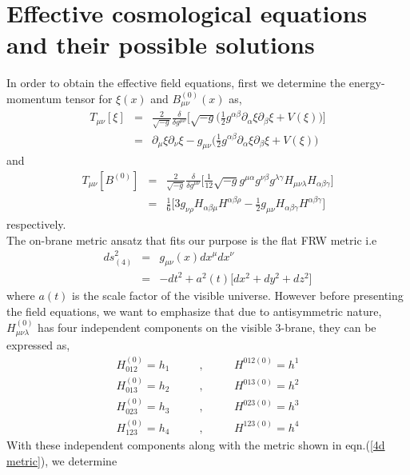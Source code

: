 \documentclass[a4paper]{article}
\begin{document}
\section{Effective cosmological equations and their possible solutions}
In order to obtain the effective field equations, 
first we determine the energy-momentum tensor for $\xi(x)$ and $B_{\mu\nu}^{(0)}(x)$ as,
\begin{eqnarray}
 T_{\mu\nu}[\xi]&=&\frac{2}{\sqrt{-g}}
 \frac{\delta}{\delta g^{\mu\nu}}\bigg[\sqrt{-g}\bigg(\frac{1}{2}g^{\alpha\beta}\partial_{\alpha}\xi\partial_{\beta}\xi + V(\xi)\bigg)\bigg]\nonumber\\
 &=&\partial_{\mu}\xi\partial_{\nu}\xi - g_{\mu\nu}\bigg(\frac{1}{2}g^{\alpha\beta}\partial_{\alpha}\xi\partial_{\beta}\xi + V(\xi)\bigg)
 \label{em tensor1}
\end{eqnarray}
and
\begin{eqnarray}
 T_{\mu\nu}[B^{(0)}]&=&\frac{2}{\sqrt{-g}}
 \frac{\delta}{\delta g^{\mu\nu}}\bigg[\frac{1}{12}\sqrt{-g}g^{\mu\alpha}g^{\nu\beta}g^{\lambda\gamma}H_{\mu\nu\lambda}H_{\alpha\beta\gamma}\bigg]\nonumber\\
 &=&\frac{1}{6}\bigg[3g_{\nu\rho}H_{\alpha\beta\mu}H^{\alpha\beta\rho} 
 - \frac{1}{2}g_{\mu\nu}H_{\alpha\beta\gamma}H^{\alpha\beta\gamma}\bigg]
 \label{em tensor2}
\end{eqnarray}
respectively.\\
The on-brane metric ansatz that fits our purpose is the flat FRW metric i.e
\begin{eqnarray}
 ds_{(4)}^2&=&g_{\mu\nu}(x) dx^{\mu}dx^{\nu}\nonumber\\
 &=&-dt^2 + a^2(t)\big[dx^2 + dy^2 + dz^2\big]
 \label{4d metric}
\end{eqnarray}
where $a(t)$ is the scale factor of the visible universe. 
However before presenting the field equations, we want to emphasize that due to antisymmetric nature, $H_{\mu\nu\lambda}^{(0)}$ has 
four independent components on the visible 3-brane, they can be expressed as,
\begin{eqnarray}
 H_{012}^{(0)} = h_1~~~~~~~~~~~~,~~~~~~~~~~~~H^{012(0)} = h^1\nonumber\\
 H_{013}^{(0)} = h_2~~~~~~~~~~~~,~~~~~~~~~~~~H^{013(0)} = h^2\nonumber\\
 H_{023}^{(0)} = h_3~~~~~~~~~~~~,~~~~~~~~~~~~H^{023(0)} = h^3\nonumber\\
 H_{123}^{(0)} = h_4~~~~~~~~~~~~,~~~~~~~~~~~~H^{123(0)} = h^4
\nonumber
\end{eqnarray}
With these independent components along with the metric shown in eqn.(\ref{4d metric}), we determine 
\end{document}
